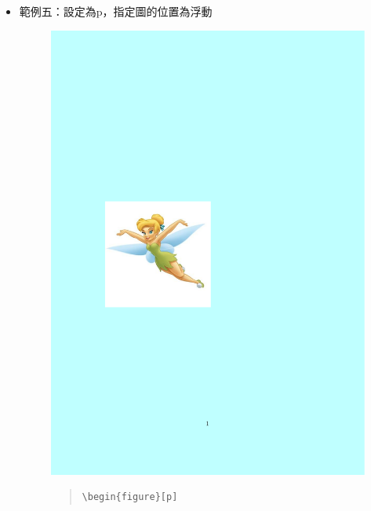 \documentclass[12pt,a4paper]{report}
\begin{document}
\begin{CJK}{UTF8}{bkai}
\begin{itemize}
\item 範例五：設定為p，指定圖的位置為浮動
\begin{figure}[!h] 
\begin{minipage}[b]{0.5\textwidth} 
\centering 
\includegraphics[scale=0.3]{./pics/float_example_3.pdf} 
\end{minipage}%
\begin{minipage}[b]{0.5\textwidth} 
\begin{footnotesize}
\begin{quote}
\begin{verbatim}
\begin{figure}[p]

\end{verbatim}
\end{quote}
\end{footnotesize}
\end{minipage}
\end{figure}
\end{itemize}
\end{CJK}
\end{document}
